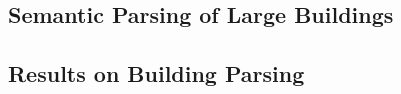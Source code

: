 









\subsection{Semantic Parsing of Large Buildings}
\subsection{Results on Building Parsing}
